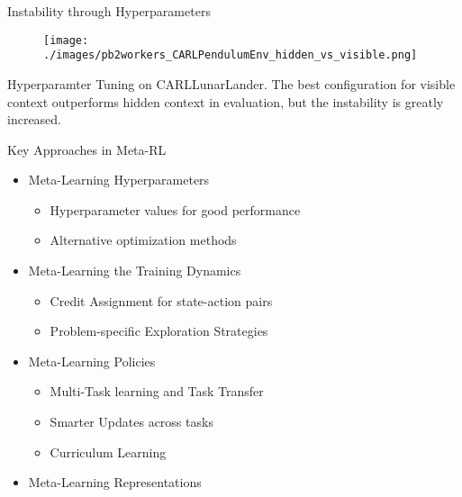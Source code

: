 \documentclass[aspectratio=169]{../latex_main/tntbeamer}  %
\begin{document}

\begin{frame}[c]{Instability through Hyperparameters~}

\begin{figure}
    \centering
    \texttt{[image: ./images/pb2workers\_CARLPendulumEnv\_hidden\_vs\_visible.png]}
    \label{fig:my_label}
\end{figure}
\centering Hyperparamter Tuning on CARLLunarLander. The best configuration for visible context outperforms hidden context in evaluation, but the instability is greatly increased.

\end{frame}

\begin{frame}[c]{Key Approaches in Meta-RL}
	
	\begin{itemize}
		\item Meta-Learning Hyperparameters
		\begin{itemize}
			\item Hyperparameter values for good performance
			\item Alternative optimization methods
		\end{itemize}
		\item Meta-Learning the Training Dynamics
		\begin{itemize}
			\item Credit Assignment for state-action pairs
			\item Problem-specific Exploration Strategies
		\end{itemize}
		\item Meta-Learning Policies
		\begin{itemize}
		    \item Multi-Task learning and Task Transfer
			\item Smarter Updates across tasks
			\item Curriculum Learning
		\end{itemize}
		\item Meta-Learning Representations
	\end{itemize}
	
	
\end{frame}
\end{document}
